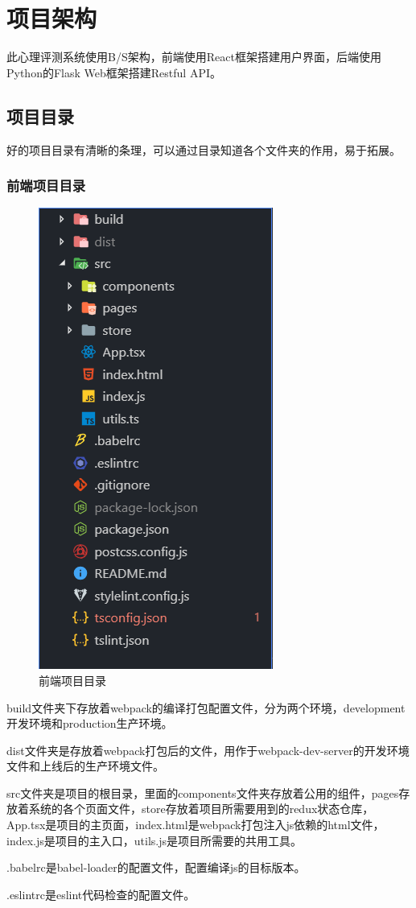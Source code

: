 \section{项目架构}
此心理评测系统使用B/S架构，前端使用React框架搭建用户界面，后端使用Python的Flask Web框架搭建Restful API。

\subsection{项目目录}

好的项目目录有清晰的条理，可以通过目录知道各个文件夹的作用，易于拓展。

\subsubsection{前端项目目录}
\begin{figure}[thbp!]
	\centering
	\includegraphics[width=0.3\linewidth]{figure/frontend_structure}
	\caption{前端项目目录}
	\label{fig:frontend_structure}
\end{figure}

build文件夹下存放着webpack的编译打包配置文件，分为两个环境，development开发环境和production生产环境。

dist文件夹是存放着webpack打包后的文件，用作于webpack-dev-server的开发环境文件和上线后的生产环境文件。

src文件夹是项目的根目录，里面的components文件夹存放着公用的组件，pages存放着系统的各个页面文件，store存放着项目所需要用到的redux状态仓库，App.tsx是项目的主页面，index.html是webpack打包注入js依赖的html文件，index.js是项目的主入口，utils.js是项目所需要的共用工具。

.babelrc是babel-loader的配置文件，配置编译js的目标版本。

.eslintrc是eslint代码检查的配置文件。

